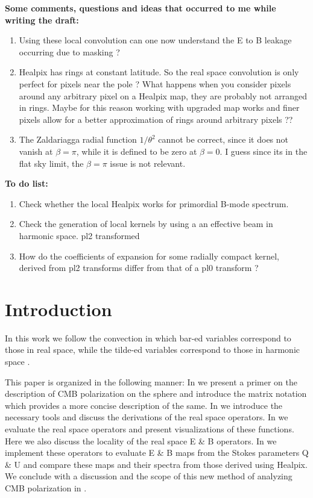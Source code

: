 \textbf{Some comments, questions and ideas that occurred to me while writing the draft:}
\begin{enumerate}
\item Using these local convolution can one now understand the E to B leakage occurring due to masking ? 

\item Healpix has rings at constant latitude. So the real space convolution is only perfect for pixels near the pole ? What happens when you consider pixels around any arbitrary pixel on a Healpix map, they are probably not arranged in rings. Maybe for this reason working with upgraded map works and finer pixels allow for a better approximation of rings around arbitrary pixels ??

\item The Zaldariagga radial function $1/\theta^2$ cannot be correct, since it does not vanish at $\beta=\pi$, while it is defined to be zero at $\beta=0$. I guess since its in the flat sky limit, the $\beta=\pi$ issue is not relevant.
\end{enumerate}

\textbf{To do list:}
\begin{enumerate}
\item Check whether the local Healpix works for primordial B-mode spectrum.
\item Check the generation of local kernels by using a an effective beam in harmonic space. pl2 transformed
\item How do the  coefficients of expansion for some radially compact kernel, derived from pl2 transforms differ from that of a pl0 transform ? 
\end{enumerate}


\newpage
\section{Introduction}

In this work we follow the convection in which bar-ed variables correspond to those in real space, while the tilde-ed variables correspond to those in harmonic space \cite{Zaldarriaga2001a}. 

This paper is organized in the following manner: In  we present a primer on the description of CMB polarization on the sphere and introduce the matrix notation which provides a more concise description of the same. In  we introduce the necessary tools  and discuss the derivations of the real space operators. In  we evaluate the real space operators and present visualizations of these functions. Here we also discuss the locality of the real space E \& B operators. In  we implement these operators to evaluate E \& B  maps from the Stokes parameters Q \& U and compare these maps and their spectra from those derived using Healpix. We conclude with a discussion and the scope of this new method of analyzing CMB polarization in .\\ \\ \\ 


